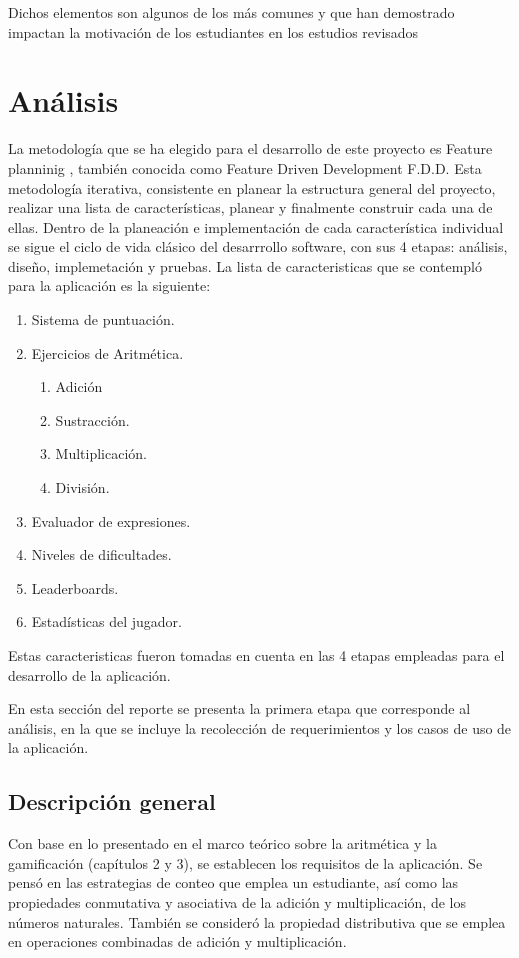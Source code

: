 \documentclass{article}
\begin{document}
Dichos elementos son algunos de los más comunes y que han demostrado impactan la motivación de los
estudiantes en los estudios revisados  \cite{wiggins2016overview,sanchez2017classcraft,ibanez2014gamification,tan2018}
\pagebreak



\section{Análisis}

La metodología que se ha elegido para el desarrollo de este proyecto es Feature planninig 
\cite{hunt2006feature}, también conocida como Feature Driven 
Development F.D.D. Esta metodología iterativa, consistente en planear
la estructura general del proyecto, realizar una lista de características, planear  y finalmente 
construir cada una de ellas. Dentro de la planeación e implementación de cada característica individual se sigue el ciclo de vida clásico del desarrrollo software, con sus 4 etapas: análisis, diseño, implemetación y pruebas. 
La lista de caracteristicas que se contempló para la aplicación es la siguiente:
\begin{enumerate}
	\item Sistema de puntuación.
	\item Ejercicios de Aritmética.
	\begin{enumerate}
		\item Adición 
		\item Sustracción.
		\item Multiplicación.
		\item División.
	\end{enumerate}
	\item Evaluador de expresiones.
	\item Niveles de dificultades.
	\item Leaderboards.
	\item Estadísticas del jugador.
\end{enumerate}

Estas caracteristicas fueron tomadas en cuenta en las 4 etapas empleadas para el desarrollo de la aplicación.
 
En esta sección del reporte se presenta la primera etapa que corresponde al análisis, en la que se incluye la recolección de requerimientos y los casos de uso de la aplicación.

\subsection{Descripción general}
Con base en lo presentado en el marco teórico sobre la aritmética y la gamificación (capítulos 2 y 3), se establecen los requisitos de la aplicación. Se pensó en las estrategias de conteo que emplea un estudiante, así como las propiedades conmutativa y asociativa de la adición y multiplicación, de los números naturales. También se consideró la propiedad distributiva que se emplea en operaciones combinadas de adición y multiplicación. 
\end{document}
